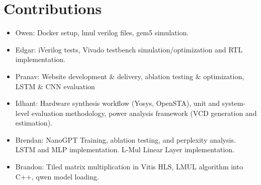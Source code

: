\documentclass[12pt,letterpaper]{article}
\begin{document}



\section{Contributions}
\begin{itemize}
    \renewcommand{\labelitemi}{--}
    \item Owen: Docker setup, lmul verilog files, gem5 simulation.
    \item Edgar: iVerilog tests, Vivado testbench simulation/optimization and RTL implementation.
    \item Pranav: Website development \& delivery, ablation testing \& optimization, LSTM \& CNN evaluation 
    \item Idhant: Hardware synthesis workflow (Yosys, OpenSTA), unit and system-level evaluation methodology, power analysis framework (VCD generation and estimation).
    \item Brendan: NanoGPT Training, ablation testing, and perplexity analysis. LSTM and MLP implementation. L-Mul Linear Layer implementation.
    \item Brandon: Tiled matrix multiplication in Vitis HLS,  LMUL algorithm into C++, qwen model loading.
\end{itemize}
\end{document}
